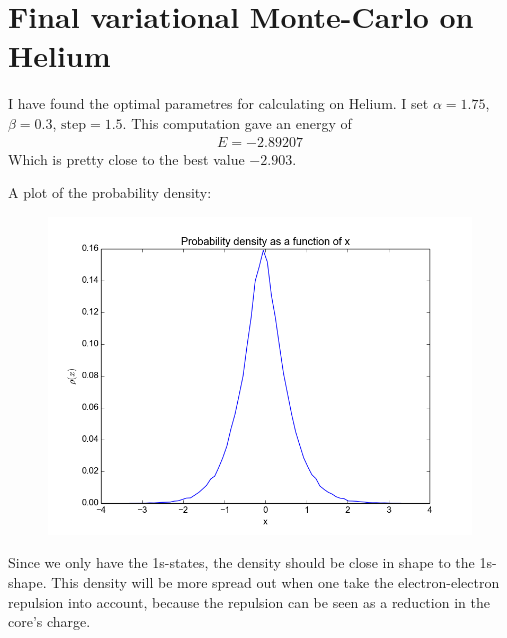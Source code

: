 \documentclass[a4paper, 12pt, titlepage]{article}
\begin{document}
\section*{Final variational Monte-Carlo on Helium}
 I have found the optimal parametres for calculating on Helium. I set $\alpha = 1.75$, $\beta = 0.3$, $\text{step} = 1.5$. This computation gave an energy of
 \begin{align*}
 	E = -2.89207
 \end{align*}
 Which is pretty close to the best value $-2.903$. 

 A plot of the probability density:
 \begin{figure}[H] 
 	\centering
 	\includegraphics[width=\textwidth]{../python_programs/ProbabilityDensity.png}
 \end{figure}
 Since we only have the 1s-states, the density should be close in shape to the 1s-shape. This density will be more spread out when one take the electron-electron repulsion into account, because the repulsion can be seen as a reduction in the core's charge. 
\end{document}
